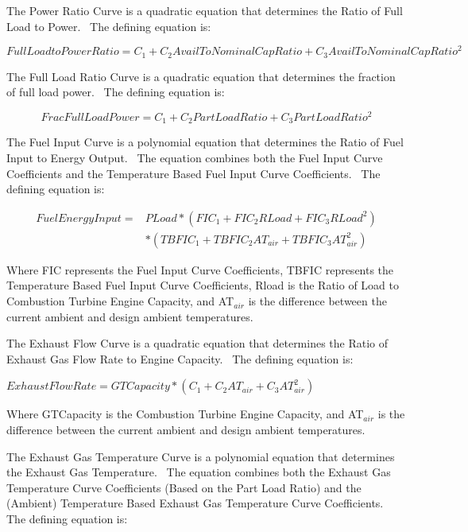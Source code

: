 The Power Ratio Curve is a quadratic equation that determines the Ratio of Full Load to Power.~ The defining equation is:

\begin{equation}
FullLoadtoPowerRatio = {C_1} + {C_2}AvailToNominalCapRatio + {C_3}AvailToNominalCapRati{o^2}
\end{equation}

The Full Load Ratio Curve is a quadratic equation that determines the fraction of full load power.~ The defining equation is:

\begin{equation}
FracFullLoadPower = {C_1} + {C_2}PartLoadRatio + {C_3}PartLoadRati{o^2}
\end{equation}

The Fuel Input Curve is a polynomial equation that determines the Ratio of Fuel Input to Energy Output.~ The equation combines both the Fuel Input Curve Coefficients and the Temperature Based Fuel Input Curve Coefficients.~ The defining equation is:

\begin{equation}
\begin{split}
FuelEnergyInput =& PLoad * (FI{C_1} + FI{C_2}RLoad + FI{C_3}RLoa{d^2}) \\
&* (TBFI{C_1} + TBFI{C_2}A{T_{air}} + TBFI{C_3}AT_{air}^2)
\end{split}
\end{equation}

Where FIC represents the Fuel Input Curve Coefficients, TBFIC represents the Temperature Based Fuel Input Curve Coefficients, Rload is the Ratio of Load to Combustion Turbine Engine Capacity, and AT\(_{air}\) is the difference between the current ambient and design ambient temperatures.

The Exhaust Flow Curve is a quadratic equation that determines the Ratio of Exhaust Gas Flow Rate to Engine Capacity.~ The defining equation is:

\emph{\(ExhaustFlowRate = GTCapacity * ({C_1} + {C_2}A{T_{air}} + {C_3}AT_{air}^2)\) ~}

Where GTCapacity is the Combustion Turbine Engine Capacity, and AT\(_{air}\) is the difference between the current ambient and design ambient temperatures.

The Exhaust Gas Temperature Curve is a polynomial equation that determines the Exhaust Gas Temperature.~ The equation combines both the Exhaust Gas Temperature Curve Coefficients (Based on the Part Load Ratio) and the (Ambient) Temperature Based Exhaust Gas Temperature Curve Coefficients.~ The defining equation is:

